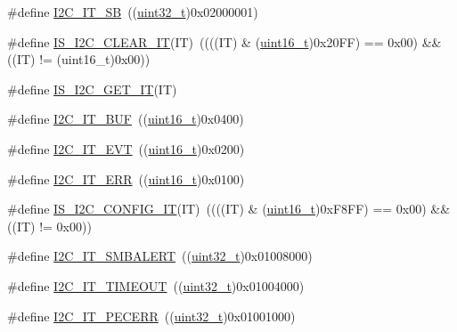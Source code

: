 \begin{DoxyCompactItemize}
\item 
\#define \hyperlink{group___i2_c__interrupts__definition_gaec2fb9bbd0e1b128b4450b2a7b312896}{I2\+C\+\_\+\+I\+T\+\_\+\+SB}~((\hyperlink{_p_e___types_8h_a33594304e786b158f3fb30289278f5af}{uint32\+\_\+t})0x02000001)
\item 
\#define \hyperlink{group___i2_c__interrupts__definition_ga368c05fc9aadd7bb4d23280791b5a751}{I\+S\+\_\+\+I2\+C\+\_\+\+C\+L\+E\+A\+R\+\_\+\+IT}(IT)~((((IT) \& (\hyperlink{_p_e___types_8h_a1f1825b69244eb3ad2c7165ddc99c956}{uint16\+\_\+t})0x20\+F\+F) == 0x00) \&\& ((\+I\+T) != (uint16\+\_\+t)0x00))
\item 
\#define \hyperlink{group___i2_c__interrupts__definition_gab3d113f3d6b6e6f7896c5d7a8d8c2d01}{I\+S\+\_\+\+I2\+C\+\_\+\+G\+E\+T\+\_\+\+IT}(IT)
\item 
\#define \hyperlink{group___i2_c__interrupts__definition_gad3ff3f405b882aa4d2f91310aa1cc0df}{I2\+C\+\_\+\+I\+T\+\_\+\+B\+UF}~((\hyperlink{_p_e___types_8h_a1f1825b69244eb3ad2c7165ddc99c956}{uint16\+\_\+t})0x0400)
\item 
\#define \hyperlink{group___i2_c__interrupts__definition_gadd59efa313e1598a084a1e5ec3905b02}{I2\+C\+\_\+\+I\+T\+\_\+\+E\+VT}~((\hyperlink{_p_e___types_8h_a1f1825b69244eb3ad2c7165ddc99c956}{uint16\+\_\+t})0x0200)
\item 
\#define \hyperlink{group___i2_c__interrupts__definition_gadba3667b439cbf4ba1e6e9aec961ab03}{I2\+C\+\_\+\+I\+T\+\_\+\+E\+RR}~((\hyperlink{_p_e___types_8h_a1f1825b69244eb3ad2c7165ddc99c956}{uint16\+\_\+t})0x0100)
\item 
\#define \hyperlink{group___i2_c__interrupts__definition_gae2695a081871336881f9105d6c847c4f}{I\+S\+\_\+\+I2\+C\+\_\+\+C\+O\+N\+F\+I\+G\+\_\+\+IT}(IT)~((((IT) \& (\hyperlink{_p_e___types_8h_a1f1825b69244eb3ad2c7165ddc99c956}{uint16\+\_\+t})0x\+F8\+F\+F) == 0x00) \&\& ((\+I\+T) != 0x00))
\item 
\#define \hyperlink{group___i2_c__interrupts__definition_gab6049d4dd856a085127752e01ebb8120}{I2\+C\+\_\+\+I\+T\+\_\+\+S\+M\+B\+A\+L\+E\+RT}~((\hyperlink{_p_e___types_8h_a33594304e786b158f3fb30289278f5af}{uint32\+\_\+t})0x01008000)
\item 
\#define \hyperlink{group___i2_c__interrupts__definition_ga45ce34b163b456a5fb3833f1264d93b4}{I2\+C\+\_\+\+I\+T\+\_\+\+T\+I\+M\+E\+O\+UT}~((\hyperlink{_p_e___types_8h_a33594304e786b158f3fb30289278f5af}{uint32\+\_\+t})0x01004000)
\item 
\#define \hyperlink{group___i2_c__interrupts__definition_ga23069e7787c4f052f34887c02bc44100}{I2\+C\+\_\+\+I\+T\+\_\+\+P\+E\+C\+E\+RR}~((\hyperlink{_p_e___types_8h_a33594304e786b158f3fb30289278f5af}{uint32\+\_\+t})0x01001000)

\end{DoxyCompactItemize}
